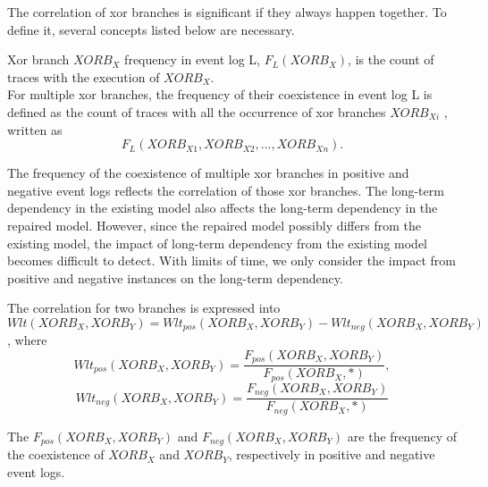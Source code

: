 The correlation of xor branches is significant if they always happen together. To define it, several concepts listed below are necessary. 
\begin{definition}
	Xor branch $XORB_X$ frequency in event log L, $F_{L}(XORB_X)$, is the count of traces with the execution of $XORB_X$. \\
	For multiple xor branches, the frequency of their coexistence in event log L is defined as the count of traces with all the occurrence of xor branches $XORB_{Xi}$ , written as \[F_{L}(XORB_{X1}, XORB_{X2},...,XORB_{Xn}).\]
\end{definition}
The frequency of the coexistence of multiple xor branches in positive and negative event logs reflects the correlation of those xor branches. The long-term dependency in the existing model also affects the long-term dependency in the repaired model. However, since the repaired model possibly differs from the existing model, the impact of long-term dependency from the existing model becomes difficult to detect. With limits of time, we only consider the impact from positive and negative instances on the long-term dependency.
\begin{definition} The correlation for two branches is expressed into
	\[Wlt(XORB_X,XORB_Y)=  Wlt_{pos}(XORB_X, XORB_Y) -Wlt_{neg}(XORB_X, XORB_Y)\], where 
	\[Wlt_{pos}(XORB_X, XORB_Y)= \frac{F_{pos}(XORB_X, XORB_Y)}{F_{pos}(XORB_X, *)},\]
	\[Wlt_{neg}(XORB_X, XORB_Y)= \frac{F_{neg}(XORB_X, XORB_Y)}{F_{neg}(XORB_X, *)}\]	
\end{definition}
The $F_{pos}(XORB_X, XORB_Y)$ and $F_{neg}(XORB_X, XORB_Y)$ are the frequency of the coexistence of $XORB_X$ and $XORB_Y$, respectively in positive and negative event logs.
